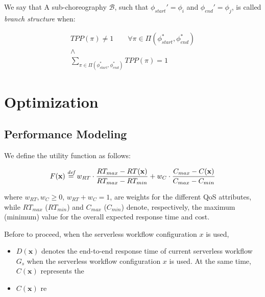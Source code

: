We say that A sub-choreography $\mathcal{B}$, such that $\phi_{start}' = \phi_i$ and $\phi_{end}' = \phi_j$, is called \textit{branch structure} when:

\begin{equation}
	\begin{array}{c}
	TPP(\pi) \neq 1 \qquad \forall \pi \in \Pi(\phi_{start}^*, \phi_{end}^*) \\
	\wedge \\
	\displaystyle\sum_{\pi \in \Pi(\phi_{start}^*, \phi_{end}^*)} TPP(\pi) = 1
	\end{array}
\end{equation}


\section{Optimization}


\subsection{Performance Modeling}






We define the utility function as follows:

\begin{equation}
	F(\textbf{x}) \overset{\textit{def}}{=} w_{RT} \cdot \dfrac{RT_{max} - RT(\textbf{x})}{RT_{max} - RT_{min}} + w_{C} \cdot \dfrac{C_{max} - C(\textbf{x})}{C_{max} - C_{min}}
\end{equation}

where $w_{RT}, w_{C} \geq 0$, $w_{RT} + w_{C} = 1$, are weights for the different QoS attributes, while $RT_{max}$ ($RT_{min}$) and $C_{max}$ ($C_{min}$) denote, respectively, the maximum (minimum) value for the overall expected response time and cost.






Before to proceed, when the serverless workflow configuration $x$ is used,




\begin{itemize}
	\item $D(\textbf{x})$ denotes the end-to-end response time of current serverless workflow $G_s$ when the serverless workflow configuration $x$ is used. At the same time, $C(\textbf{x})$ represents the  
	\item $C(\textbf{x})$ re
\end{itemize}

